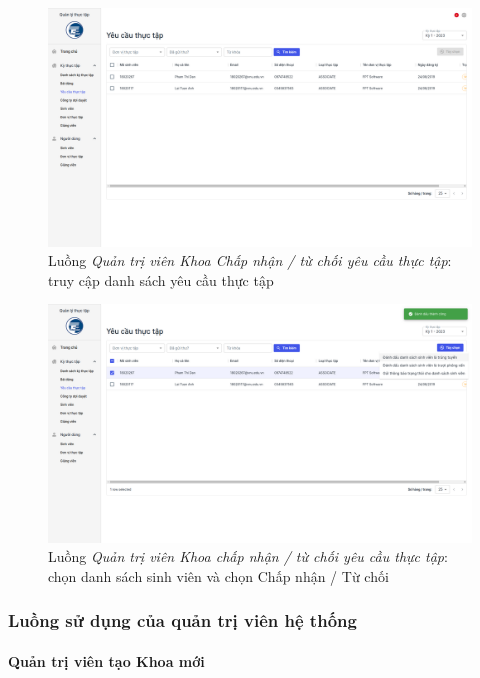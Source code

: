 \documentclass[./../main.tex]{subfiles}
\begin{document}
\begin{figure}[]
	\includegraphics[width=\linewidth]{./images/image72.png}
	\caption{Luồng \emph{Quản trị viên Khoa Chấp nhận / từ chối yêu cầu thực tập}: truy cập danh sách yêu cầu thực tập}
	\label{fig:org_admin_access_list_requests}
\end{figure}

\begin{figure}[]
	\includegraphics[width=\linewidth]{./images/image73.png}
	\caption{Luồng \emph{Quản trị viên Khoa chấp nhận / từ chối yêu cầu thực tập}: chọn danh sách sinh viên và chọn Chấp nhận / Từ chối}
	\label{fig:org_admin_select_requests}
\end{figure}

\subsubsection{Luồng sử dụng của quản trị viên hệ thống}

\paragraph*{Quản trị viên tạo Khoa mới}
\end{document}
